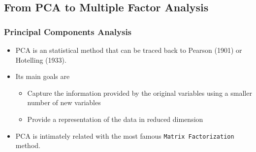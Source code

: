 \documentclass{beamer}
\begin{document}

\subsection{From PCA to Multiple Factor Analysis}

\begin{frame}
	\frametitle{Principal Components Analysis}
	\begin{itemize}
		\item PCA is an statistical method that can be traced back to Pearson (1901) or Hotelling (1933).
		\item Its main goals are
		\begin{itemize}
			\item Capture the information provided by the original variables using a smaller number of new variables
			\item Provide a representation of the data in reduced dimension
		\end{itemize}
		\item PCA is intimately related with the most famous \texttt{Matrix Factorization} method.
	\end{itemize}
\end{frame}
\end{document}
